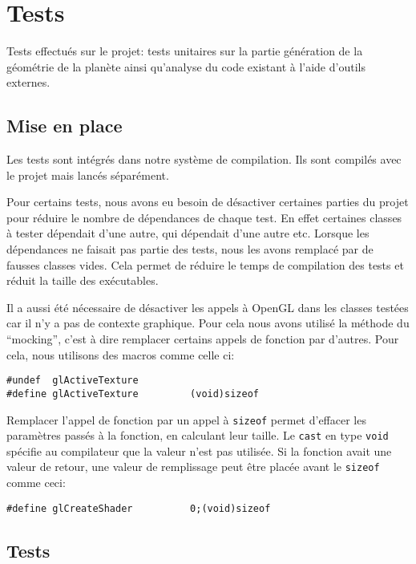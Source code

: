 \chapter{Tests}\label{tests}

Tests effectués sur le projet: tests unitaires sur la partie génération
de la géométrie de la planète ainsi qu'analyse du code existant à l'aide
d'outils externes.

\section{Mise en place}\label{mise-en-place}

Les tests sont intégrés dans notre système de compilation. Ils sont
compilés avec le projet mais lancés séparément.

Pour certains tests, nous avons eu besoin de désactiver certaines
parties du projet pour réduire le nombre de dépendances de chaque test.
En effet certaines classes à tester dépendait d'une autre, qui dépendait
d'une autre etc. Lorsque les dépendances ne faisait pas partie des
tests, nous les avons remplacé par de fausses classes vides. Cela permet
de réduire le temps de compilation des tests et réduit la taille des
exécutables.

Il a aussi été nécessaire de désactiver les appels à OpenGL dans les
classes testées car il n'y a pas de contexte graphique. Pour cela nous
avons utilisé la méthode du ``mocking'', c'est à dire remplacer certains
appels de fonction par d'autres. Pour cela, nous utilisons des macros
comme celle ci:

\lstset{language=C++}
\begin{lstlisting}
#undef  glActiveTexture
#define glActiveTexture         (void)sizeof
\end{lstlisting}

Remplacer l'appel de fonction par un appel à \texttt{sizeof} permet
d'effacer les paramètres passés à la fonction, en calculant leur taille.
Le \texttt{cast} en type \texttt{void} spécifie au compilateur que la valeur
n'est pas utilisée. Si la fonction avait une valeur de retour, une
valeur de remplissage peut être placée avant le \texttt{sizeof} comme
ceci:

\lstset{language=C++}
\begin{lstlisting}
#define glCreateShader          0;(void)sizeof
\end{lstlisting}


\section{Tests}\label{tests-1}

